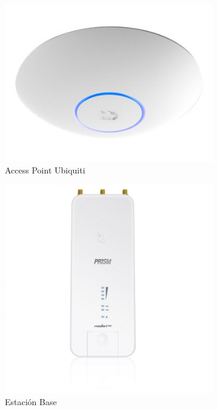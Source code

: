 \documentclass{article}
\begin{document}
\begin{figure}[ht]
	\centering
	\begin{subfigure}{0.4\textwidth}
		\includegraphics[width=\linewidth]{src/ap.jpg}
		\caption{Access Point Ubiquiti}
		\label{fig:ap}
	\end{subfigure}%
	\begin{subfigure}{0.3\textwidth}
		\includegraphics[width=\linewidth]{src/estacion base.jpeg}
		\caption{Estación Base}
		\label{fig:estacionbase}
	\end{subfigure}
	\caption{}
	\label{fig:accesspoint}
\end{figure}
\end{document}
